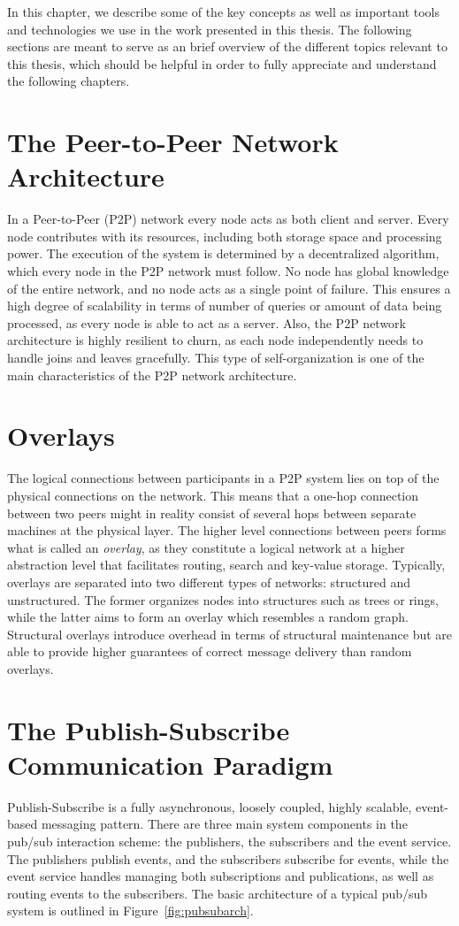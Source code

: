 In this chapter, we describe some of the key concepts as well as
important tools and technologies we use in the work presented in this
thesis. The following sections are meant to serve as an brief overview of
the different topics relevant to this thesis, which should be helpful in order
to fully appreciate and understand the following chapters.

\section{The Peer-to-Peer Network Architecture}
In a Peer-to-Peer (P2P) network every node acts as both client and
server. Every node contributes with its resources, including both
storage space and processing power. The execution of the system is
determined by a decentralized algorithm, which every node in the P2P
network must follow. No node has global knowledge of the entire network,
and no node acts as a single point of failure. This ensures a high
degree of scalability in terms of number of queries or amount of data
being processed, as every node is able to act as a server. Also, the P2P
network architecture is highly resilient to churn, as each node
independently needs to handle joins and leaves gracefully. This type of
self-organization is one of the main characteristics of the P2P network
architecture.

\section{Overlays}
The logical connections between participants in a P2P
system lies on top of the physical connections on the network. This
means that a one-hop connection between two peers might in reality
consist of several hops between separate machines at the physical layer.
The higher level connections between peers forms what is called an
\emph{overlay}, as they constitute a logical network at a higher abstraction
level that facilitates routing, search and key-value storage. Typically,
overlays are separated into two different types of networks: structured
and unstructured. The former organizes nodes into structures such as
trees or rings, while the latter aims to form an overlay which resembles
a random graph. Structural overlays introduce overhead in terms of
structural maintenance but are able to provide higher guarantees of
correct message delivery than random overlays.

\section{The Publish-Subscribe Communication Paradigm}
Publish-Subscribe is a fully asynchronous, loosely coupled,
highly scalable, event-based messaging pattern. There are three main
system components in the pub/sub interaction scheme: the publishers, the
subscribers and the event service. The publishers publish events, and
the subscribers subscribe for events, while the event service handles
managing both subscriptions and publications, as well as routing events
to the subscribers. The basic architecture of a typical pub/sub system
is outlined in Figure~\ref{fig:pubsubarch}.

